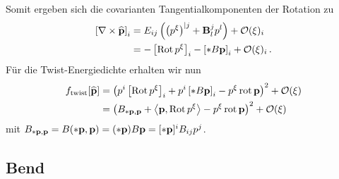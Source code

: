 \documentclass[a4paper,11pt]{scrartcl}
\newcommand{\landau}{\mathcal{O}}
\begin{document}
Somit ergeben sich die covarianten Tangentialkomponenten der Rotation zu
\begin{align}
  \left[ \nabla\times\pExt \right]_{i} &= E_{ij}\left( \left( p^{\xi} \right)^{|j} + \tensor{B}{^{j}_{l}}p^{l}\right)  + \landau(\xi)_{i}
                                       \label{eq:rottang}\\
                                       &= -\left[ \Rot p^{\xi} \right]_{i} - \left[ *B\pb \right]_{i} + \landau(\xi)_{i} \formPeriod
\end{align}
Für die Twist-Energiedichte erhalten wir nun
\begin{align}
  f_{\text{twist}}[\pExt] &= \left( p^{i}\left[ \Rot p^{\xi} \right]_{i} + p^{i}\left[ *B\pb \right]_{i}  
                                    - p^{\xi}\rot\pb \right)^{2} + \landau(\xi) \\
                          &= \left( B_{*\pb,\pb} + \left\langle \pb, \Rot p^{\xi} \right\rangle - p^{\xi}\rot\pb \right)^{2}
                              + \landau(\xi)
\end{align}
mit \(  B_{*\mathbf{p},\mathbf{p}} = B(*\mathbf{p},\mathbf{p}) = (*\mathbf{p})B\mathbf{p} = [*\mathbf{p}]^{i}B_{ij}p^{j} \).

\subsection{Bend}
\end{document}
